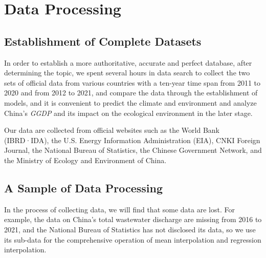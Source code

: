 \documentclass[12pt]{article}
\begin{document}
		
	\section{Data Processing} %
	\subsection{Establishment of Complete Datasets} %
	
	In order to establish a more authoritative, accurate and perfect database, after determining the topic, we spent several hours in data search to collect the two sets of official data from various countries with a ten-year time span from 2011 to 2020 and from 2012 to 2021, and compare the data through the establishment of models, and it is convenient to predict the climate and environment and analyze China's \textit{GGDP} and its impact on the ecological environment in the later stage.
	
	Our data are collected from official websites such as the World Bank (IBRD·IDA), the U.S. Energy Information Administration (EIA), CNKI Foreign Journal, the National Bureau of Statistics, the Chinese Government Network, and the Ministry of Ecology and Environment of China.
	\subsection{A Sample of Data Processing} %
	In the process of collecting data, we will find that some data are lost. For example, the data on China's total wastewater discharge are missing from 2016 to 2021, and the National Bureau of Statistics has not disclosed its data, so we use its sub-data for the comprehensive operation of mean interpolation and regression interpolation. 
\end{document}
